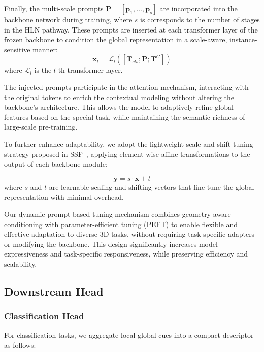Finally, the multi-scale prompts $\mathbf{P}=[\mathbf{p}_{1}, \ldots, \mathbf{p}_{s}]$ are incorporated into the backbone network during training, where $s$ is corresponds to the number of stages in the HLN pathway. These prompts are inserted at each transformer layer of the frozen backbone to condition the global representation in a scale-aware, instance-sensitive manner:
\begin{equation}
	\mathbf{x}_l = \mathcal{L}_l\left([\mathbf{T}_{cls}; \mathbf{P}; \mathbf{T}^{G}]\right)
\end{equation}
where $\mathcal{L}_l$ is the $l$-th transformer layer. 

The injected prompts participate in the attention mechanism, interacting with the original tokens to enrich the contextual modeling without altering the backbone’s architecture. This allows the model to adaptively refine global features based on the special task, while maintaining the semantic richness of large-scale pre-training.

To further enhance adaptability, we adopt the lightweight scale-and-shift tuning strategy proposed in SSF~\cite{lian2022scaling}, applying element-wise affine transformations to the output of each backbone module:

\begin{equation}
	\mathbf{y} = s \cdot \mathbf{x} + t
\end{equation}
where $s$ and $t$ are learnable  scaling and shifting  vectors that fine-tune the global representation with minimal overhead.

Our dynamic prompt-based tuning mechanism combines geometry-aware conditioning with parameter-efficient tuning (PEFT) to enable flexible and effective adaptation to diverse 3D tasks, without requiring task-specific adapters or modifying the backbone. This design significantly increases model expressiveness and task-specific responsiveness, while preserving efficiency and scalability.

\subsection{Downstream Head}
\label{sec:head}

\subsubsection{Classification Head}
For classification tasks, we aggregate local-global cues into a compact descriptor as follows:

